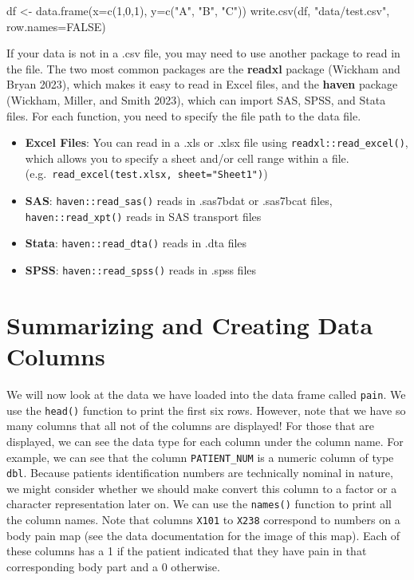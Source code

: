 \documentclass[
  letterpaper,
]{krantz}
\makeatletter
\newenvironment{Shaded}{\begin{snugshade}}{\end{snugshade}}
\newcommand{\AttributeTok}[1]{\textcolor[rgb]{0.40,0.45,0.13}{#1}}
\newcommand{\ConstantTok}[1]{\textcolor[rgb]{0.56,0.35,0.01}{#1}}
\newcommand{\DecValTok}[1]{\textcolor[rgb]{0.68,0.00,0.00}{#1}}
\newcommand{\FunctionTok}[1]{\textcolor[rgb]{0.28,0.35,0.67}{#1}}
\newcommand{\NormalTok}[1]{\textcolor[rgb]{0.00,0.23,0.31}{#1}}
\newcommand{\OtherTok}[1]{\textcolor[rgb]{0.00,0.23,0.31}{#1}}
\newcommand{\StringTok}[1]{\textcolor[rgb]{0.13,0.47,0.30}{#1}}
\newenvironment{kframe}{%
\medskip{}
\setlength{\fboxsep}{.8em}
 \def\at@end@of@kframe{}%
 \ifinner\ifhmode%
  \def\at@end@of@kframe{\end{minipage}}%
  \begin{minipage}{\columnwidth}%
 \fi\fi%
 \def\FrameCommand##1{\hskip\@totalleftmargin \hskip-\fboxsep
 \colorbox{shadecolor}{##1}\hskip-\fboxsep
     \hskip-\linewidth \hskip-\@totalleftmargin \hskip\columnwidth}%
 \MakeFramed {\advance\hsize-\width
   \@totalleftmargin\z@ \linewidth\hsize
   \@setminipage}}%
 {\par\unskip\endMakeFramed%
 \at@end@of@kframe}
\renewenvironment{Shaded}{\begin{kframe}}{\end{kframe}}
\makeatother
\begin{document}
\begin{Shaded}
\begin{Highlighting}[]
\NormalTok{df }\OtherTok{\textless{}{-}} \FunctionTok{data.frame}\NormalTok{(}\AttributeTok{x=}\FunctionTok{c}\NormalTok{(}\DecValTok{1}\NormalTok{,}\DecValTok{0}\NormalTok{,}\DecValTok{1}\NormalTok{), }\AttributeTok{y=}\FunctionTok{c}\NormalTok{(}\StringTok{"A"}\NormalTok{, }\StringTok{"B"}\NormalTok{, }\StringTok{"C"}\NormalTok{))}
\FunctionTok{write.csv}\NormalTok{(df, }\StringTok{"data/test.csv"}\NormalTok{, }\AttributeTok{row.names=}\ConstantTok{FALSE}\NormalTok{)}
\end{Highlighting}
\end{Shaded}

If your data is not in a .csv file, you may need to use another package
to read in the file. The two most common packages are the
\textbf{readxl} package (Wickham and Bryan 2023), which makes it easy to
read in Excel files, and the \textbf{haven} package (Wickham, Miller,
and Smith 2023), which can import SAS, SPSS, and Stata files. For each
function, you need to specify the file path to the data file.

\begin{itemize}
\item
  \textbf{Excel Files}: You can read in a .xls or .xlsx file using
  \texttt{readxl::read\_excel()}, which allows you to specify a sheet
  and/or cell range within a file.
  (e.g.~\texttt{read\_excel(\textquotesingle{}test.xlsx\textquotesingle{},\ sheet="Sheet1")})
\item
  \textbf{SAS}: \texttt{haven::read\_sas()} reads in .sas7bdat or
  .sas7bcat files, \texttt{haven::read\_xpt()} reads in SAS transport
  files
\item
  \textbf{Stata}: \texttt{haven::read\_dta()} reads in .dta files
\item
  \textbf{SPSS}: \texttt{haven::read\_spss()} reads in .spss files
\end{itemize}

\section{Summarizing and Creating Data
Columns}\label{summarizing-and-creating-data-columns}

We will now look at the data we have loaded into the data frame called
\texttt{pain}. We use the \texttt{head()} function to print the first
six rows. However, note that we have so many columns that all not of the
columns are displayed! For those that are displayed, we can see the data
type for each column under the column name. For example, we can see that
the column \texttt{PATIENT\_NUM} is a numeric column of type
\texttt{dbl}. Because patients identification numbers are technically
nominal in nature, we might consider whether we should make convert this
column to a factor or a character representation later on. We can use
the \texttt{names()} function to print all the column names. Note that
columns \texttt{X101} to \texttt{X238} correspond to numbers on a body
pain map (see the data documentation for the image of this map). Each of
these columns has a 1 if the patient indicated that they have pain in
that corresponding body part and a 0 otherwise.
\end{document}

